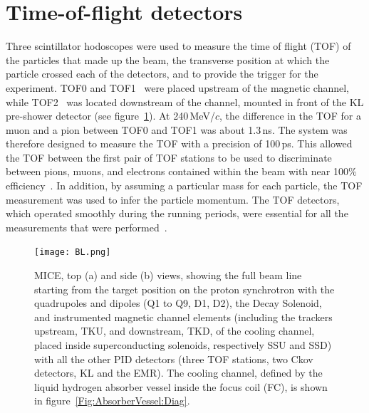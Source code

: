 \graphicspath{{02-TOF/Figures/}}

\newcommand{\Tzero}{\ensuremath{T0}}
\newcommand{\Gauss}{\ensuremath{\text{G}}}
\newcommand{\Dt}{\ensuremath{\Delta t}}
\newcommand{\us}{\ensuremath{\mu\text{s}}}

\section{Time-of-flight detectors}
\label{Sect:TOF}

Three scintillator hodoscopes were used to measure the time of flight
(TOF) of the particles that made up the beam, the transverse position
at which the particle crossed each of the detectors, and to provide
the trigger for the experiment. 
TOF0 and TOF1~\cite{NOTE145,NOTE241,2010NIMPA.615...14B} were
placed upstream of the magnetic channel, while TOF2~\cite{NOTE286}
was located downstream of the channel, mounted in front of the KL
pre-shower detector (see figure~\ref{fig:BL}).
At 240\,MeV/$c$, the difference in the TOF for a muon and a
pion between TOF0 and TOF1 was about 1.3\,ns.
The system was therefore designed to measure the TOF with a
precision of 100\,ps. 
This allowed the TOF between the first pair of TOF stations 
to be used to discriminate between pions, muons, and electrons
contained within the beam with near 100\% efficiency~\cite{2016JInst..11P3001A}.
In addition, by assuming a particular mass for each particle, the
TOF measurement was used to infer the particle
momentum.
The TOF detectors, which operated smoothly during the running periods,
were essential for all the measurements that were
performed~\cite{Bogomilov:2012sr,Adams:2013lba,2015JInst..10P2012A,2016JInst..11P3001A,Adams:2018qhj,Bogomilov:2019kfj}.
\begin{figure}
  \begin{center}
    \texttt{[image: BL.png]}
    \caption{
      MICE, top (a) and side (b) views, showing the full beam line
      starting from the target position on the proton synchrotron with the quadrupoles and dipoles (Q1 to Q9, D1, D2), the
      Decay Solenoid, and instrumented magnetic channel elements
      (including the trackers upstream, TKU, and downstream, TKD, of the cooling
      channel, placed inside superconducting solenoids, respectively SSU and SSD) with all the
      other PID detectors (three TOF stations, two Ckov detectors, KL and
      the EMR).
      The cooling channel, defined by the liquid hydrogen absorber
      vessel inside the focus coil (FC), is shown in figure~\ref{Fig:AbsorberVessel:Diag}.
    }
    \label{fig:BL}
  \end{center}
\end{figure}

